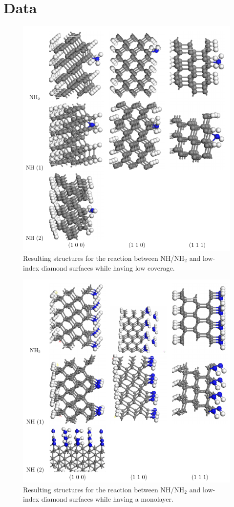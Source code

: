 \documentclass[10pt,a4paper]{article}
\begin{document}
\section{Data}





\begin{figure}[h!] \captionsetup{width=.8\linewidth} \caption{Resulting structures for the reaction between NH/NH$_2$ and low-index diamond surfaces while having low coverage.} \label{lowcoverage}
\includegraphics[width=.8\linewidth]{pictures/singleSite_result.png}
\end{figure}


\begin{figure}[h!] \captionsetup{width=.8\linewidth}  \caption{Resulting structures for the reaction between NH/NH$_2$ and low-index diamond surfaces while having a monolayer.} \label{highcoverage}
\includegraphics[width=.8\linewidth]{pictures/monolayer_result.png}
\end{figure}
\end{document}
